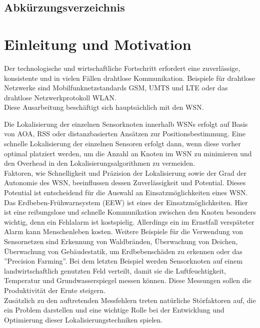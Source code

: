 \documentclass[12pt, a4wide]{scrreprt}
\begin{document}
\newpage
\pagestyle{empty}
\section*{Abkürzungsverzeichnis}
 \begin{acronym}
\end{acronym}

\newpage
\tableofcontents
{}

\chapter{Einleitung und Motivation}
Der technologische und wirtschaftliche Fortschritt erfordert eine zuverlässige, konsistente und in vielen Fällen drahtlose Kommunikation. Beispiele für drahtlose Netzwerke sind Mobilfunknetzstandards GSM, UMTS und LTE oder das drahtlose Netzwerkprotokoll WLAN.\\
\indent
Diese Ausarbeitung beschäftigt sich hauptsächlich mit den \ac{WSN}.

\indent
Die Lokalisierung der einzelnen Sensorknoten innerhalb WSNs erfolgt auf Basis von \ac{AOA}, \ac{RSS} oder distanzbasierten Ansätzen zur Positionsbestimmung. Eine schnelle Lokalisierung der einzelnen Sensoren erfolgt dann, wenn diese vorher optimal platziert werden, um die Anzahl an Knoten im WSN zu minimieren und den Overhead in den Lokalisierungsalgorithmen zu vermeiden\cite{area_based}.\\
\indent
Faktoren, wie Schnelligkeit und Präzision der Lokalisierung sowie der Grad der Autonomie des WSN, beeinflussen dessen Zuverlässigkeit und Potential. Dieses Potential ist entscheidend für die Auswahl an Einsatzmöglichkeiten eines WSN. Das Erdbeben-Frühwarnsystem (EEW) ist eines der Einsatzmöglichkeiten. Hier ist eine reibungslose und schnelle Kommunikation zwischen den Knoten besonders wichtig, denn ein Fehlalarm ist kostspielig. Allerdings ein im Ernstfall verspäteter Alarm kann Menschenleben kosten. Weitere Beispiele für die Verwendung von Sensornetzen sind Erkennung von Waldbränden, Überwachung von Deichen, Überwachung von Gebäudestatik, um Erdbebenschäden zu erkennen\cite{building_monitoring} oder das ''Precision Farming''. Bei dem letzten Beispiel werden Sensorknoten auf einem landwirtschaftlich genutzten Feld verteilt, damit sie die Luftfeuchtigkeit, Temperatur und Grundwasserspiegel messen können. Diese Messungen sollen die Produktivität der Ernte steigern.\\
\indent
Zusätzlich zu den auftretenden Messfehlern treten natürliche Störfaktoren auf, die ein Problem darstellen und eine wichtige Rolle bei der Entwicklung und Optimierung dieser Lokalisierungstechniken spielen.
\end{document}
